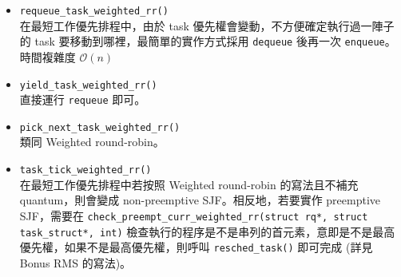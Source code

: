 \documentclass{res}
\begin{document}
\begin{resume}
\begin{itemize}
	\item
	\lstinline{requeue_task_weighted_rr()} \\
	在最短工作優先排程中，由於 task 優先權會變動，不方便確定執行過一陣子的 task 要移動到哪裡，最簡單的實作方式採用 \lstinline{dequeue} 後再一次 \lstinline{enqueue}。時間複雜度 $\mathcal{O}(n)$
	
	\item
	\lstinline{yield_task_weighted_rr()} \\		直接運行 \lstinline{requeue} 即可。
	
	\item
	\lstinline{pick_next_task_weighted_rr()} \\
	類同 Weighted round-robin。	
	
	\item
	\lstinline{task_tick_weighted_rr()} \\
	在最短工作優先排程中若按照 Weighted round-robin 的寫法且不補充 quantum，則會變成 non-preemptive SJF。相反地，若要實作 preemptive SJF，需要在 \lstinline{check_preempt_curr_weighted_rr(struct rq*, struct task_struct*, int)} 檢查執行的程序是不是串列的首元素，意即是不是最高優先權，如果不是最高優先權，則呼叫 \lstinline{resched_task()} 即可完成 (詳見 Bonus RMS 的寫法)。
\end{itemize}

\vspace*{.1in} 


\end{resume}
\end{document}
